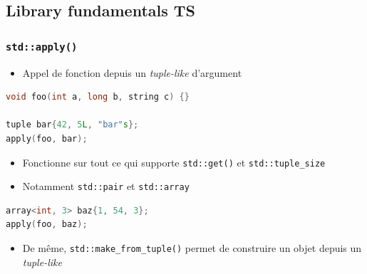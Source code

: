 \documentclass[C++.tex]{subfiles}
\begin{document}
\subsection*{Library fundamentals TS}
\begin{frame}[fragile]
	\frametitle{\lstinline|std::apply()|}
	\begin{itemize}
		\item Appel de fonction depuis un \textit{tuple-like} d'argument
	\end{itemize}

	\begin{lstlisting}[language=C++]
void foo(int a, long b, string c) {}

tuple bar{42, 5L, "bar"s};
apply(foo, bar);\end{lstlisting}

	\begin{itemize}
		\item Fonctionne sur tout ce qui supporte \lstinline|std::get()| et \lstinline|std::tuple_size|
		\item Notamment \lstinline|std::pair| et \lstinline|std::array|
	\end{itemize}

	\begin{lstlisting}[language=C++]
array<int, 3> baz{1, 54, 3};
apply(foo, baz);\end{lstlisting}

	\begin{itemize}
		\item De même, \lstinline|std::make_from_tuple()| permet de construire un objet depuis un \textit{tuple-like}
	\end{itemize}
\end{frame}
\end{document}
